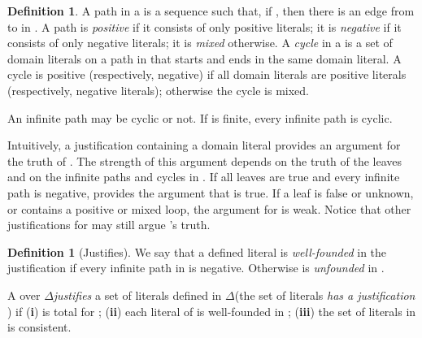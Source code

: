 \documentclass[11pt]{article}
\newcommand{\m}[1]{\ensuremath{#1}\xspace}
\newcommand{\D}{\m{\Delta}}
\theoremstyle{plain}
\theoremstyle{definition}
\newtheorem{definition}[thm]{Definition}
\theoremstyle{example_basic}
\theoremstyle{example_contd}
\theoremstyle{plain}
\newcommand{\tbf}[1]{\textbf{#1}}
\newcommand{\change}[1]{#1}
\begin{document}
\begin{definition}
\change{A path in a \justification \jgraph is a sequence  such that, if , then there is an edge from  to  in \jgraph. 
A path is \emph{positive} if it consists of only positive literals; it is \emph{negative} if it consists of only negative literals; it is \emph{mixed} otherwise. 
A \emph{cycle} in a \justification \jgraph is a set of domain literals
on a path in \jgraph that starts and ends in the same domain literal. A cycle is positive (respectively, negative) if all domain literals are positive literals (respectively, negative literals); otherwise the cycle is mixed.}
\end{definition}
\change{An infinite path may be cyclic or not. If  is finite, every infinite path is cyclic.}

\change{Intuitively, a justification  containing a domain literal  provides an argument for the  truth of . The strength of  this argument depends  on the truth of the leaves  and on the infinite paths and cycles in .  If all leaves are true and every infinite path is negative,  provides the argument that  is true. If a leaf is false or unknown, or  contains a positive or mixed loop, the argument for  is weak. Notice that other justifications for  may still argue 's truth. }

\begin{definition}[Justifies]\label{def:justifies}
\change{We say that a defined literal  is \emph{well-founded} in the justification   if every infinite path in  is negative. Otherwise  is \emph{unfounded} in \jgraph.} 

A \justification  over \D \emph{justifies} a set of literals  defined in \D (the set  of literals \emph{has a justification} ) if (\tbf{i})  is total for ; (\tbf{ii}) \change{each literal of  is well-founded in ;} (\tbf{iii}) the set of literals in  is consistent.
\end{definition} 
\end{document}
